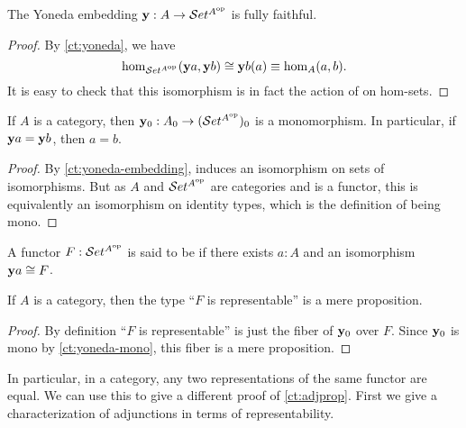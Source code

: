 \begin{cor}\label{ct:yoneda-embedding}
  The Yoneda embedding $\mathbf{y} :A\to \mathcal{S}et^{A^{\textrm{op}}}$ is fully faithful.
\end{cor}
\begin{proof}
  By \autoref{ct:yoneda}, we have
  \[ \hom_{\mathcal{S}et^{A^{\textrm{op}}}}(\mathbf{y} a, \mathbf{y} b) \cong \mathbf{y} b(a) \equiv \hom_A(a,b). \]
  It is easy to check that this isomorphism is in fact the action of \y on hom-sets.
\end{proof}

\begin{cor}\label{ct:yoneda-mono}
  If $A$ is a category, then $\mathbf{y}_0 : A_0 \to (\mathcal{S}et^{A^{\textrm{op}}})_0$ is a monomorphism.
  In particular, if $\mathbf{y} a = \mathbf{y} b$, then $a=b$.
\end{cor}
\begin{proof}
  By \autoref{ct:yoneda-embedding}, \y induces an isomorphism on sets of isomorphisms.
  But as $A$ and $\mathcal{S}et^{A^{\textrm{op}}}$ are categories and \y is a functor, this is equivalently an isomorphism on identity types, which is the definition of being mono.
\end{proof}

\begin{defn}\label{ct:representable}
  A functor $F:\mathcal{S}et^{A^{\textrm{op}}}$ is said to be  if there exists $a:A$ and an isomorphism $\mathbf{y} a \cong F$.
\end{defn}

\begin{thm}\label{ct:representable-prop}
  If $A$ is a category, then the type ``$F$ is representable'' is a mere proposition.
\end{thm}
\begin{proof}
  By definition ``$F$ is representable'' is just the fiber of $\mathbf{y}_0$ over $F$.
  Since $\mathbf{y}_0$ is mono by \autoref{ct:yoneda-mono}, this fiber is a mere proposition.
\end{proof}

In particular, in a category, any two representations of the same functor are equal.
We can use this to give a different proof of \autoref{ct:adjprop}.
First we give a characterization of adjunctions in terms of representability.

